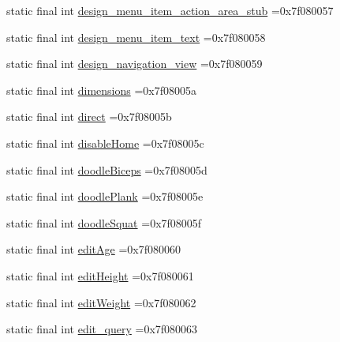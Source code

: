 \begin{DoxyCompactItemize}
\item 
static final int \mbox{\hyperlink{classcom_1_1example_1_1trainawearapplication_1_1_r_1_1id_a85b460dc96cd8a714b4b55abd1b51080}{design\+\_\+menu\+\_\+item\+\_\+action\+\_\+area\+\_\+stub}} =0x7f080057
\item 
static final int \mbox{\hyperlink{classcom_1_1example_1_1trainawearapplication_1_1_r_1_1id_a235a8568ea2092f7a633fb673d03cd6c}{design\+\_\+menu\+\_\+item\+\_\+text}} =0x7f080058
\item 
static final int \mbox{\hyperlink{classcom_1_1example_1_1trainawearapplication_1_1_r_1_1id_a6ab4f32d2e8ce1d1a6d49050af9c84f7}{design\+\_\+navigation\+\_\+view}} =0x7f080059
\item 
static final int \mbox{\hyperlink{classcom_1_1example_1_1trainawearapplication_1_1_r_1_1id_ad7ccf92ceb5d14bd43686a8fece4d49d}{dimensions}} =0x7f08005a
\item 
static final int \mbox{\hyperlink{classcom_1_1example_1_1trainawearapplication_1_1_r_1_1id_ad0b53bf870b862dd1eec521f6e6b06a6}{direct}} =0x7f08005b
\item 
static final int \mbox{\hyperlink{classcom_1_1example_1_1trainawearapplication_1_1_r_1_1id_aa2015992ac9731a2ee0e6900a421cd45}{disable\+Home}} =0x7f08005c
\item 
static final int \mbox{\hyperlink{classcom_1_1example_1_1trainawearapplication_1_1_r_1_1id_a83866166d06d3b6beaa71c4e495a5bd7}{doodle\+Biceps}} =0x7f08005d
\item 
static final int \mbox{\hyperlink{classcom_1_1example_1_1trainawearapplication_1_1_r_1_1id_a74adbe26c1bd2bb4c1a167d5ca75319d}{doodle\+Plank}} =0x7f08005e
\item 
static final int \mbox{\hyperlink{classcom_1_1example_1_1trainawearapplication_1_1_r_1_1id_a3996c72ccb2da809a19548e85572973b}{doodle\+Squat}} =0x7f08005f
\item 
static final int \mbox{\hyperlink{classcom_1_1example_1_1trainawearapplication_1_1_r_1_1id_afaf722de0113a8bde48f88a04244d75f}{edit\+Age}} =0x7f080060
\item 
static final int \mbox{\hyperlink{classcom_1_1example_1_1trainawearapplication_1_1_r_1_1id_a29c926b2832847c7c17ee3328f008d5c}{edit\+Height}} =0x7f080061
\item 
static final int \mbox{\hyperlink{classcom_1_1example_1_1trainawearapplication_1_1_r_1_1id_a79e16482edd59b00f8feacae8e0051fe}{edit\+Weight}} =0x7f080062
\item 
static final int \mbox{\hyperlink{classcom_1_1example_1_1trainawearapplication_1_1_r_1_1id_a4b7d45c3566136f38abed2c7ba5470f2}{edit\+\_\+query}} =0x7f080063

\end{DoxyCompactItemize}
